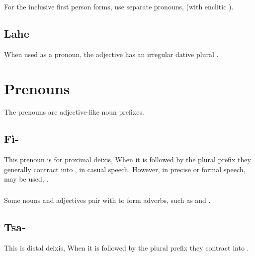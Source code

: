 

\subsubsection{} For the inclusive first person forms, use separate
pronouns,  (with enclitic  ).

\subsection{Lahe} When used as a pronoun, the adjective 
 has an irregular dative plural .
\label{morph:lahe:dat-pl}


\section{Prenouns}

\noindent The prenouns are adjective-like noun prefixes. 

\subsection{Fì-} This prenoun is for proximal deixis,   When
it is followed by the plural prefix  they generally contract
into ,  in casual speech.  However, in precise or
formal speech,  may be used, . \label{morph:prenoun:fi}
 

\subsubsection{} Some nouns and adjectives pair with  to form
adverbs, such as   and  .

\subsection{Tsa-} This is distal deixis,   When it is
followed by the plural prefix  they contract into 
. 
 

